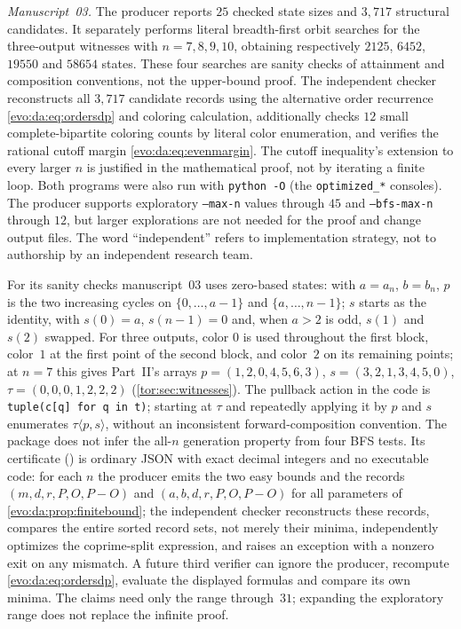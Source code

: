 \documentclass[11pt,a4paper]{article}
\numberwithin{equation}{section}
\theoremstyle{definition}
\theoremstyle{remark}
\begin{document}
\emph{Manuscript~03.} The producer reports $25$ checked state sizes and
$3{,}717$ structural candidates. It separately performs literal breadth-first
orbit searches for the three-output witnesses with $n=7,8,9,10$, obtaining
respectively $2125$, $6452$, $19550$ and $58654$ states. These four searches
are sanity checks of attainment and composition conventions, not the
upper-bound proof. The independent checker reconstructs all $3{,}717$
candidate records using the alternative order recurrence
\eqref{evo:da:eq:ordersdp} and coloring calculation, additionally checks $12$
small complete-bipartite coloring counts by literal color enumeration, and
verifies the rational cutoff margin \eqref{evo:da:eq:evenmargin}. The cutoff
inequality's extension to every larger $n$ is justified in the mathematical
proof, not by iterating a finite loop. Both programs were also run with
\texttt{python -O} (the \texttt{optimized\_*} consoles). The producer supports
exploratory \texttt{--max-n} values through $45$ and \texttt{--bfs-max-n}
through $12$, but larger explorations are not needed for the proof and change
output files. The word ``independent'' refers to implementation strategy, not
to authorship by an independent research team.

For its sanity checks manuscript~03 uses zero-based states: with $a=a_n$,
$b=b_n$, $p$ is the two increasing cycles on $\{0,\ldots,a-1\}$ and
$\{a,\ldots,n-1\}$; $s$ starts as the identity, with $s(0)=a$, $s(n-1)=0$
and, when $a>2$ is odd, $s(1)$ and $s(2)$ swapped. For three outputs, color
$0$ is used throughout the first block, color~$1$ at the first point of the
second block, and color~$2$ on its remaining points; at $n=7$ this gives
Part~II's arrays $p=(1,2,0,4,5,6,3)$, $s=(3,2,1,3,4,5,0)$,
$\tau=(0,0,0,1,2,2,2)$ (\cref{tor:sec:witnesses}). The pullback action in the
code is \texttt{tuple(c[q] for q in t)}; starting at $\tau$ and repeatedly
applying it by $p$ and $s$ enumerates $\tau\langle p,s\rangle$, without an
inconsistent forward-composition convention. The package does not infer the
all-$n$ generation property from four BFS tests. Its certificate
() is ordinary JSON
with exact decimal integers and no executable code: for each $n$ the producer
emits the two easy bounds and the records $(m,d,r,P,O,P-O)$ and
$(a,b,d,r,P,O,P-O)$ for all parameters of \cref{evo:da:prop:finitebound}; the
independent checker reconstructs these records, compares the entire sorted
record sets, not merely their minima, independently optimizes the
coprime-split expression, and raises an exception with a nonzero exit on any
mismatch. A future third verifier can ignore the producer, recompute
\eqref{evo:da:eq:ordersdp}, evaluate the displayed formulas and compare its
own minima. The claims need only the range through~$31$; expanding the
exploratory range does not replace the infinite proof.
\end{document}
